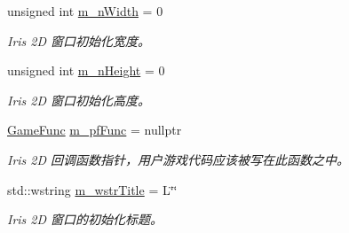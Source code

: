 \begin{DoxyCompactItemize}
\mbox{\label{struct_iris2_d_1_1_iris_application_1_1_iris_app_start_info_a6bc24eb8432766a73244dfa4dbebab2b}} 
unsigned int \hyperlink{struct_iris2_d_1_1_iris_application_1_1_iris_app_start_info_a6bc24eb8432766a73244dfa4dbebab2b}{m\+\_\+n\+Width} = 0
\begin{DoxyCompactList}\small\item\em Iris 2D 窗口初始化宽度。 \end{DoxyCompactList}\item 
\mbox{\label{struct_iris2_d_1_1_iris_application_1_1_iris_app_start_info_a05180868d302caaeed1ea93b9443be3b}} 
unsigned int \hyperlink{struct_iris2_d_1_1_iris_application_1_1_iris_app_start_info_a05180868d302caaeed1ea93b9443be3b}{m\+\_\+n\+Height} = 0
\begin{DoxyCompactList}\small\item\em Iris 2D 窗口初始化高度。 \end{DoxyCompactList}\item 
\mbox{\label{struct_iris2_d_1_1_iris_application_1_1_iris_app_start_info_a33e7344a1e119e2db1e1a185dd1174f0}} 
\hyperlink{class_iris2_d_1_1_iris_application_ac74720e6cd3a1968f73e92ea99675884}{Game\+Func} \hyperlink{struct_iris2_d_1_1_iris_application_1_1_iris_app_start_info_a33e7344a1e119e2db1e1a185dd1174f0}{m\+\_\+pf\+Func} = nullptr
\begin{DoxyCompactList}\small\item\em Iris 2D 回调函数指针，用户游戏代码应该被写在此函数之中。 \end{DoxyCompactList}\item 
\mbox{\label{struct_iris2_d_1_1_iris_application_1_1_iris_app_start_info_a18a045ecc35ff343a38da429c2e59cdf}} 
std\+::wstring \hyperlink{struct_iris2_d_1_1_iris_application_1_1_iris_app_start_info_a18a045ecc35ff343a38da429c2e59cdf}{m\+\_\+wstr\+Title} = L\char`\"{}\char`\"{}
\begin{DoxyCompactList}\small\item\em Iris 2D 窗口的初始化标题。 \end{DoxyCompactList}\end{DoxyCompactItemize}


